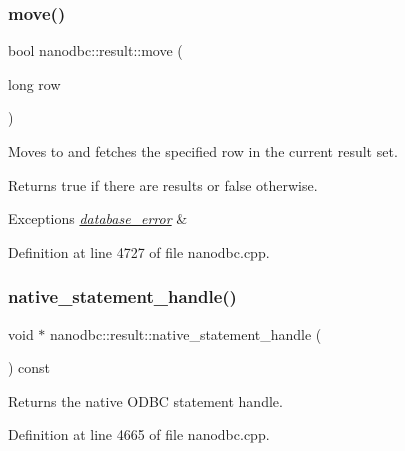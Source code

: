 \mbox{\label{classnanodbc_1_1result_a70388a8ca569a6e30367a45f215f2986}} 
\subsubsection{\texorpdfstring{move()}{move()}}
{\footnotesize\ttfamily bool nanodbc\+::result\+::move (\begin{DoxyParamCaption}\item[{long}]{row }\end{DoxyParamCaption})}



Moves to and fetches the specified row in the current result set. 

\begin{DoxyReturn}{Returns}
true if there are results or false otherwise. 
\end{DoxyReturn}

\begin{DoxyExceptions}{Exceptions}
{\em \mbox{\hyperlink{classnanodbc_1_1database__error}{database\+\_\+error}}} & \\
\hline
\end{DoxyExceptions}


Definition at line 4727 of file nanodbc.\+cpp.

\mbox{\label{classnanodbc_1_1result_aa98342a662f490baeaaf686e815b0896}} 
\subsubsection{\texorpdfstring{native\_statement\_handle()}{native\_statement\_handle()}}
{\footnotesize\ttfamily void $\ast$ nanodbc\+::result\+::native\+\_\+statement\+\_\+handle (\begin{DoxyParamCaption}{ }\end{DoxyParamCaption}) const}



Returns the native O\+D\+BC statement handle. 



Definition at line 4665 of file nanodbc.\+cpp.

